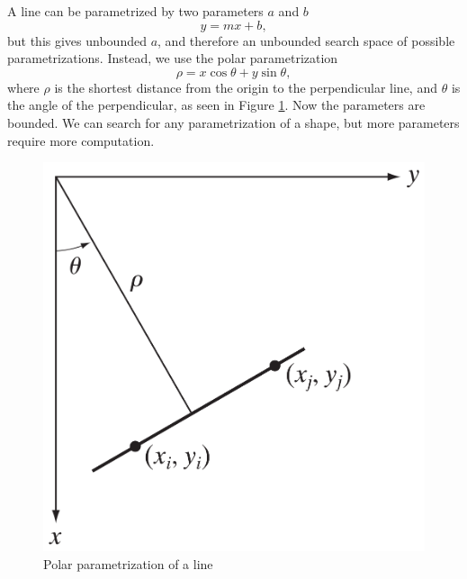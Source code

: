 A line can be parametrized by two parameters $a$ and $b$
\begin{equation}
    y = mx + b,
\end{equation}
but this gives unbounded $a$, and therefore an unbounded search space of possible parametrizations. Instead, we use the polar parametrization
\begin{equation}
    \rho = x \cos \theta + y \sin \theta,
\end{equation}
where $\rho$ is the shortest distance from the origin to the perpendicular line, and $\theta$ is the angle of the perpendicular, as seen in Figure \ref{fig:polar-line}. Now the parameters are bounded. We can search for any parametrization of a shape, but more parameters require more computation.

\begin{figure}[htbp]
    \centering
    \includegraphics[width=.6\linewidth]{images/R_theta_line}
    \caption{Polar parametrization of a line}
    \label{fig:polar-line}
\end{figure}

